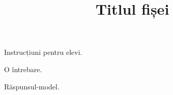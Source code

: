 \documentclass{texign-worksheet}
\title{Titlul fișei}
\author{}
\date{}
\begin{document}
\maketitle

\begin{instructions}
Instrucțiuni pentru elevi.
\end{instructions}

\begin{exercise}[title=Primul exercițiu]
\begin{questions}
\question[2] O întrebare.
\answerlines[2]
\begin{answer}
Răspunsul-model.
\end{answer}
\end{questions}
\end{exercise}
\end{document}
